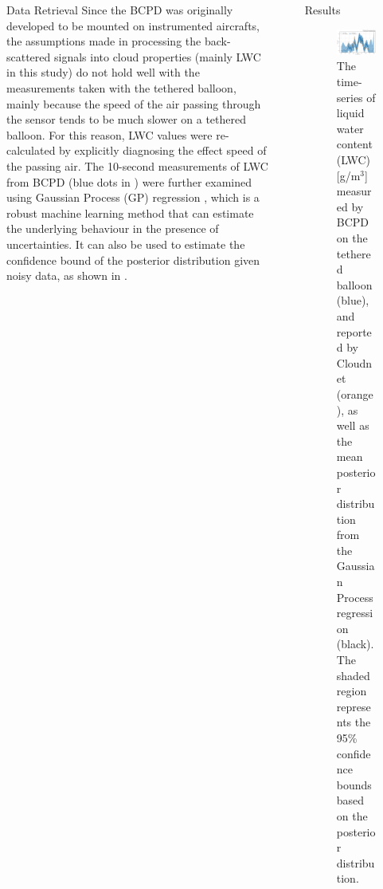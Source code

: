 \documentclass[final]{beamer}
\newlength{\sepwidth}
\newlength{\colwidth}
\newcommand{\separatorcolumn}{\begin{column}{\sepwidth}\end{column}}
\begin{document}
\begin{frame}[t]
\begin{columns}[t]
\begin{column}{\colwidth}
\begin{exampleblock}{Data Retrieval}
        Since the BCPD was originally developed to be mounted on instrumented aircrafts, the assumptions made in processing the back-scattered signals into cloud properties (mainly LWC in this study) do not hold well with the measurements taken with the tethered balloon, mainly because the speed of the air passing through the sensor tends to be much slower on a tethered balloon. For this reason, LWC values were re-calculated by explicitly diagnosing the effect speed of the passing air. The 10-second measurements of LWC from BCPD (blue dots in ) were further examined using Gaussian Process (GP) regression \cite{Rasmussen:2006vz}, which is a robust machine learning method that can estimate the underlying behaviour in the presence of uncertainties. It can also be used to estimate the confidence bound of the posterior distribution given noisy data, as shown in .

      \end{exampleblock}

    \end{column}
    \separatorcolumn

    \begin{column}{\colwidth}

      \begin{alertblock}{Results}

        \begin{figure}
          \centering
          \includegraphics[width=0.95\colwidth]{img/ts_gp.png}
          \caption{ The time-series of liquid water content (LWC) [g/m$^3$] measured by BCPD on the tethered balloon (blue), and reported by Cloudnet \cite{illingworth2007cloudnet} (orange), as well as the mean posterior distribution from the Gaussian Process regression (black). The shaded region represents the 95\% confidence bounds based on the posterior distribution. }
          \label{fig:03}
        \end{figure}


\end{alertblock}
\end{column}
\end{columns}
\end{frame}
\end{document}
